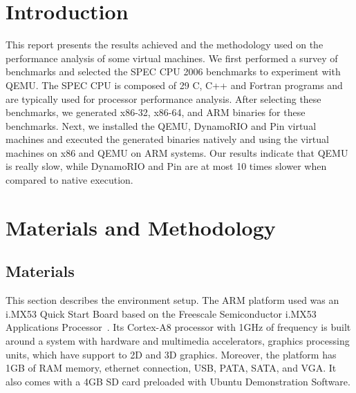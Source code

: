 \documentclass[11pt,twoside]{article}
\begin{document}
\newcommand{\qemuversion}{1.1.1}
\newcommand{\perfversion}{2.6.32-46}%
\newcommand{\dynamorioversion}{4.0.1-1}
\newcommand{\pinversion}{2.12-58423}
\newcommand{\pincompiler}{gcc 4.4.7}



\section{Introduction}
  This report presents the results achieved and the methodology
  used on the performance analysis of some virtual machines.
  We first performed a survey of benchmarks and selected the SPEC CPU
  2006 benchmarks to experiment with QEMU.
  The SPEC CPU is composed of 29 C, C++ and Fortran programs and are
  typically used for processor performance analysis. After selecting
  these benchmarks, we generated x86-32,
  x86-64, and ARM binaries for these benchmarks. Next, we installed
  the QEMU, DynamoRIO and Pin virtual machines and
  executed the generated binaries
  natively and using the virtual machines on x86 and QEMU on
  ARM systems.
  Our results indicate that QEMU is really slow, while DynamoRIO
  and Pin are at most 10 times slower 
  when compared to native execution.

\section{Materials and Methodology}

\subsection{Materials}
  This section describes the environment setup.
  The ARM platform used was an i.MX53 Quick Start Board
  based on the Freescale Semiconductor i.MX53 Applications
  Processor~\cite{imx53}. Its Cortex-A8 processor with 1GHz
  of frequency is built around a system
  with hardware and multimedia accelerators, graphics processing
  units, which have support to 2D and 3D graphics. Moreover,
  the platform has 1GB of RAM memory, ethernet connection,
  USB, PATA, SATA, and VGA. It also comes with a 4GB SD card
  preloaded with Ubuntu Demonstration Software.
\end{document}
